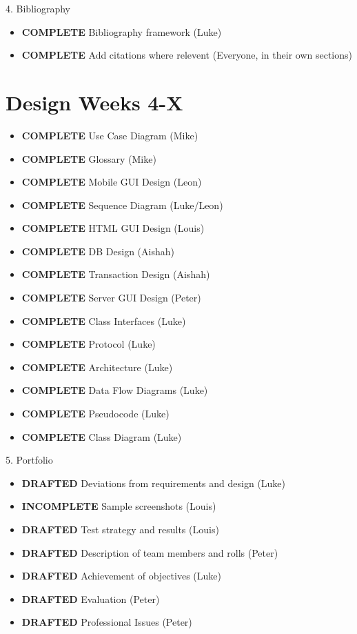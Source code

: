 4. Bibliography
\begin{itemize}
\item \textbf{COMPLETE} Bibliography framework (Luke)
\item \textbf{COMPLETE} Add citations where relevent (Everyone, in their own sections)
\end{itemize}

\section{Design \textbf{Weeks 4-X}}
\begin{itemize}
\item \textbf{COMPLETE}   Use Case Diagram (Mike)
\item \textbf{COMPLETE}   Glossary (Mike)
\item \textbf{COMPLETE}   Mobile GUI Design (Leon)
\item \textbf{COMPLETE}   Sequence Diagram (Luke/Leon)
\item \textbf{COMPLETE}   HTML GUI Design (Louis)
\item \textbf{COMPLETE}   DB Design (Aishah)
\item \textbf{COMPLETE}   Transaction Design (Aishah)
\item \textbf{COMPLETE}   Server GUI Design (Peter)
\item \textbf{COMPLETE}   Class Interfaces (Luke)
\item \textbf{COMPLETE}   Protocol (Luke)
\item \textbf{COMPLETE}   Architecture (Luke)
\item \textbf{COMPLETE}   Data Flow Diagrams (Luke)
\item \textbf{COMPLETE}   Pseudocode (Luke)
\item \textbf{COMPLETE}   Class Diagram (Luke)
\end{itemize}

5. Portfolio
\begin{itemize}
\item \textbf{DRAFTED}    Deviations from requirements and design (Luke)
\item \textbf{INCOMPLETE} Sample screenshots (Louis)
\item \textbf{DRAFTED}    Test strategy and results (Louis)
\item \textbf{DRAFTED}    Description of team members and rolls (Peter)
\item \textbf{DRAFTED}    Achievement of objectives (Luke)
\item \textbf{DRAFTED}    Evaluation (Peter)
\item \textbf{DRAFTED}    Professional Issues (Peter)
\end{itemize}


